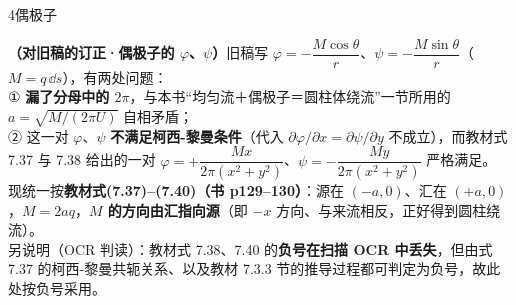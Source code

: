 \begin{kaodian}{4}{偶极子}
\begin{tishi}
\textbf{（对旧稿的订正·偶极子的 $\varphi$、$\psi$）}旧稿写 $\varphi=-\dfrac{M\cos\theta}{r}$、$\psi=-\dfrac{M\sin\theta}{r}$（$M=q\,\dd s$），有两处问题：\\
① \textbf{漏了分母中的 $2\pi$}，与本书“均匀流＋偶极子＝圆柱体绕流”一节所用的 $a=\sqrt{M/(2\pi U)}$ 自相矛盾；\\
② 这一对 $\varphi$、$\psi$ \textbf{不满足柯西-黎曼条件}（代入 $\partial\varphi/\partial x=\partial\psi/\partial y$ 不成立），而教材式 7.37 与 7.38 给出的一对 $\varphi=+\dfrac{Mx}{2\pi(x^2+y^2)}$、$\psi=-\dfrac{My}{2\pi(x^2+y^2)}$ 严格满足。\\
现统一按\textbf{教材式(7.37)--(7.40)（书 p129--130）}：源在 $(-a,0)$、汇在 $(+a,0)$，$M=2aq$，\textbf{$M$ 的方向由汇指向源}（即 $-x$ 方向、与来流相反，正好得到圆柱绕流）。\\
另说明（OCR 判读）：教材式 7.38、7.40 的\textbf{负号在扫描 OCR 中丢失}，但由式 7.37 的柯西-黎曼共轭关系、以及教材 7.3.3 节的推导过程都可判定为负号，故此处按负号采用。
\end{tishi}
\end{kaodian}

